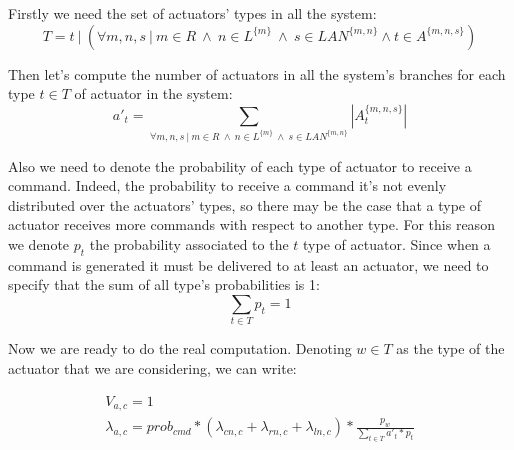 \documentclass[11pt]{article}
\begin{document}

Firstly we need the set of actuators' types in all the system:
\begin{equation}
    T = t \ | \ (\forall m,n,s \ | \ m \in R \ \land \ n \in L^{\{m\}} \ \land \ s \in LAN^{\{m, n\}} \land t \in A^{\{m,n,s\}})
\end{equation}

Then let's compute the number of actuators in all the system's branches for each type $t \in T$ of actuator in the system:
\begin{equation}
    a'_{t} = \sum_{\forall m,n,s \ | \ m \in R \ \land \ n \in L^{\{m\}} \ \land \ s \in LAN^{\{m, n\}}}{ |A^{\{m, n, s\}}_{t}| }
\end{equation}


Also we need to denote the probability of each type of actuator to receive a command. Indeed, the probability to receive a command it's not evenly distributed over the actuators' types, so there may be the case that a type of actuator receives more commands with respect to another type.
For this reason we denote $p_t$ the probability associated to the $t$ type of actuator.
Since when a command is generated it must be delivered to at least an actuator, we need to specify that the sum of all type's probabilities is 1:
\begin{equation}
    \sum_{t \in T}{p_t} = 1
\end{equation}

Now we are ready to do the real computation. Denoting $w \in T$ as the type of the actuator that we are considering, we can write:

\begin{equation}
	\begin{array}{l}
		V_{a,c} = 1 \\
        \lambda_{a, c} = prob_{cmd} * (\lambda_{cn, c} + \lambda_{rn, c} + \lambda_{ln, c}) * \frac{p_{w}}{\sum\limits_{t \in T}{a'_{t} * p_{t}}}\\
	\end{array}
\end{equation}
\end{document}
